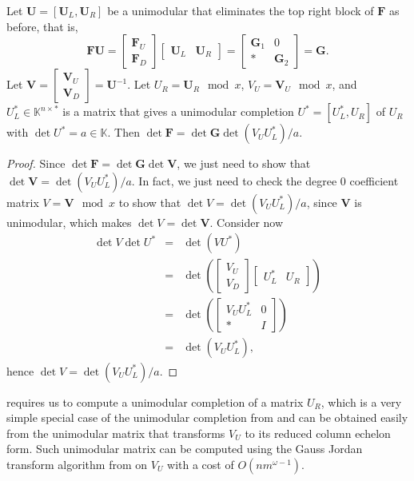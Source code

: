 \begin{lem}
\label{lem:scalingToDeterminant}Let $\mathbf{U}=\left[\mathbf{U}_{L},\mathbf{U}_{R}\right]$
be a unimodular that eliminates the top right block of $\mathbf{F}$
as before, that is, 
\[
\mathbf{F}\mathbf{U}=\begin{bmatrix}\mathbf{F}_{U}\\
\mathbf{F}_{D}
\end{bmatrix}\begin{bmatrix}\mathbf{U}_{L} & \mathbf{U}_{R}\end{bmatrix}=\begin{bmatrix}\mathbf{G}_{1} & 0\\
* & \mathbf{G}_{2}
\end{bmatrix}=\mathbf{G}.
\]
 Let $\mathbf{V}=\begin{bmatrix}\mathbf{V}_{U}\\
\mathbf{V}_{D}
\end{bmatrix}=\mathbf{U}^{-1}$. Let $U_{R}=\mathbf{U}_{R}\mod x$, $V_{U}=\mathbf{V}_{U}\mod x$,
and $U_{L}^{*}\in\mathbb{K}^{n\times*}$ is a matrix that gives a
unimodular completion $U^{*}=\left[U_{L}^{*},U_{R}\right]$ of $U_{R}$
with $\det U^{*}=a\in\mathbb{K}$. Then $\det\mathbf{F}=\det\mathbf{G}\det\left(V_{U}U_{L}^{*}\right)/a$.\end{lem}
\begin{proof}
Since $\det\mathbf{F}=\det\mathbf{G}\det\mathbf{V}$, we just need
to show that $\det\mathbf{V}=\det\left(V_{U}U_{L}^{*}\right)/a$.
In fact, we just need to check the degree 0 coefficient matrix $V=\mathbf{V}\mod x$
to show that $\det V=\det\left(V_{U}U_{L}^{*}\right)/a$, since $\mathbf{V}$
is unimodular, which makes $\det V=\det\mathbf{V}$. Consider now
\begin{eqnarray*}
\det V\det U^{*} & = & \det\left(VU^{*}\right)\\
 & = & \det\left(\begin{bmatrix}V_{U}\\
V_{D}
\end{bmatrix}\begin{bmatrix}U_{L}^{*} & U_{R}\end{bmatrix}\right)\\
 & = & \det\left(\begin{bmatrix}V_{U}U_{L}^{*} & 0\\
* & I
\end{bmatrix}\right)\\
 & = & \det\left(V_{U}U_{L}^{*}\right),
\end{eqnarray*}
 hence $\det V=\det\left(V_{U}U_{L}^{*}\right)/a$.
\end{proof}
 requires us to compute a unimodular
completion of a matrix $U_{R}$, which is a very simple special case
of the unimodular completion from 
and can be obtained easily from the unimodular matrix that transforms
$V_{U}$ to its reduced column echelon form. Such unimodular matrix
can be computed using the Gauss Jordan transform algorithm from \citet{storjohann:phd2000}
on $V_{U}$ with a cost of $O\left(nm^{\omega-1}\right)$.

